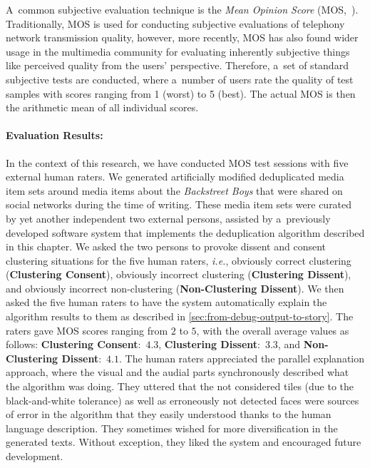 A~common subjective evaluation technique
is the \emph{Mean Opinion Score} (MOS,~\cite{itu1998mos}).
Traditionally, MOS is used for conducting subjective evaluations
of telephony network transmission quality,
however, more recently, MOS has also found
wider usage in the multimedia community
for evaluating inherently subjective things
like perceived quality from the users' perspective.
Therefore, a~set of standard subjective tests are conducted,
where a~number of users rate the quality of test samples
with scores ranging from 1 (worst) to 5 (best).
The actual MOS is then the arithmetic mean of all individual scores.

\paragraph{Evaluation Results:}

In the context of this research,
we have conducted MOS test sessions
with five external human raters.
We generated artificially modified deduplicated media item sets
around media items about the \emph{Backstreet Boys}
that were shared on social networks during the time of writing.
These media item sets were curated by yet another independent two external persons,
assisted by a~previously developed software system
that implements the deduplication algorithm described in this chapter.
We asked the two persons to provoke dissent and consent clustering situations
for the five human raters, \emph{i.e.}, obviously correct clustering
(\textbf{Clustering Consent}), obviously incorrect clustering
(\textbf{Clustering Dissent}), and obviously incorrect non-clustering
(\textbf{Non-Clustering Dissent}).
We then asked the five human raters to have the system
automatically explain the algorithm results to them
as described in \autoref{sec:from-debug-output-to-story}.
The raters gave MOS scores ranging from $2$ to $5$,
with the overall average values as follows:
\textbf{Clustering Consent}:~$4.3$, \textbf{Clustering Dissent}:~$3.3$,
and \textbf{Non-Clustering Dissent}:~$4.1$.
The human raters appreciated the parallel explanation approach,
where the visual and the audial parts synchronously described
what the algorithm was doing.
They uttered that the not considered tiles (due to the black-and-white tolerance)
as well as erroneously not detected faces were sources of error
in the algorithm that they easily understood
thanks to the human language description.
They sometimes wished for more diversification in the generated texts.
Without exception, they liked the system and encouraged future development.

